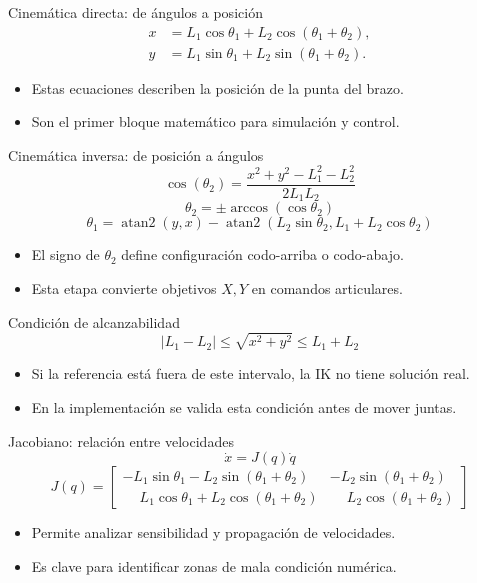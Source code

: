\documentclass[aspectratio=169]{beamer}
\begin{document}
\begin{frame}{Cinemática directa: de ángulos a posición}
\[
\begin{aligned}
x &= L_1\cos\theta_1 + L_2\cos(\theta_1+\theta_2),\\
y &= L_1\sin\theta_1 + L_2\sin(\theta_1+\theta_2).
\end{aligned}
\]
\begin{itemize}
  \item Estas ecuaciones describen la posición de la punta del brazo.
  \item Son el primer bloque matemático para simulación y control.
\end{itemize}
\end{frame}

\begin{frame}{Cinemática inversa: de posición a ángulos}
\[
\cos(\theta_2)=\frac{x^2+y^2-L_1^2-L_2^2}{2L_1L_2}
\]
\[
\theta_2=\pm\arccos(\cos\theta_2)
\]
\[
\theta_1=\operatorname{atan2}(y,x)-\operatorname{atan2}(L_2\sin\theta_2, L_1+L_2\cos\theta_2)
\]
\begin{itemize}
  \item El signo de $\theta_2$ define configuración codo-arriba o codo-abajo.
  \item Esta etapa convierte objetivos $X,Y$ en comandos articulares.
\end{itemize}
\end{frame}

\begin{frame}{Condición de alcanzabilidad}
\[
|L_1-L_2| \leq \sqrt{x^2+y^2} \leq L_1+L_2
\]
\begin{itemize}
  \item Si la referencia está fuera de este intervalo, la IK no tiene solución real.
  \item En la implementación se valida esta condición antes de mover juntas.
\end{itemize}
\end{frame}

\begin{frame}{Jacobiano: relación entre velocidades}
\[
\dot{x} = J(q)\dot{q}
\]
\[
J(q)=
\begin{bmatrix}
- L_1\sin\theta_1 - L_2\sin(\theta_1+\theta_2) & -L_2\sin(\theta_1+\theta_2) \\
\phantom{-}L_1\cos\theta_1 + L_2\cos(\theta_1+\theta_2) & \phantom{-}L_2\cos(\theta_1+\theta_2)
\end{bmatrix}
\]
\begin{itemize}
  \item Permite analizar sensibilidad y propagación de velocidades.
  \item Es clave para identificar zonas de mala condición numérica.
\end{itemize}
\end{frame}
\end{document}
